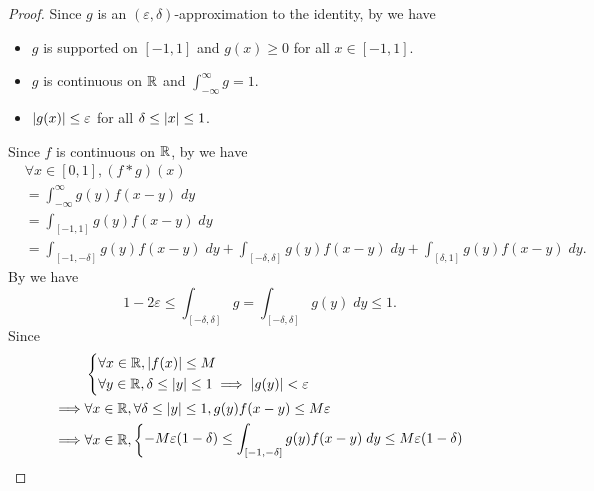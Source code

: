 \begin{proof}
  Since \(g\) is an \((\varepsilon, \delta)\)-approximation to the identity, by  we have
  \begin{itemize}
    \item \(g\) is supported on \([-1, 1]\) and \(g(x) \geq 0\) for all \(x \in [-1, 1]\).
    \item \(g\) is continuous on \(\mathbb{R}\) and \(\int_{-\infty}^\infty g = 1\).
    \item \(\left\lvert g(x)\right\rvert \leq \varepsilon\) for all \(\delta \leq \left\lvert x\right\rvert \leq 1\).
  \end{itemize}
  Since \(f\) is continuous on \(\mathbb{R}\), by  we have
  \begin{align*}
     & \forall x \in [0, 1], (f * g)(x)                                                                                                    \\
     & = \int_{-\infty}^\infty g(y) f(x - y) \; dy                                                                                         \\
     & = \int_{[-1, 1]} g(y) f(x - y) \; dy                                                                                                \\
     & = \int_{[-1, -\delta]} g(y) f(x - y) \; dy + \int_{[-\delta, \delta]} g(y) f(x - y) \; dy + \int_{[\delta, 1]} g(y) f(x - y) \; dy.
  \end{align*}
  By  we have
  \[
    1 - 2 \varepsilon \leq \int_{[-\delta, \delta]} g = \int_{[-\delta, \delta]} g(y) \; dy \leq 1.
  \]
  Since
  \begin{align*}
             & \begin{dcases}
                 \forall x \in \R, \abs{f(x)} \leq M \\
                 \forall y \in \R, \delta \leq \abs{y} \leq 1 \implies \abs{g(y)} < \varepsilon
               \end{dcases}                                                                           \\
    \implies & \forall x \in \R, \forall \delta \leq \abs{y} \leq 1, g(y) f(x - y) \leq M \varepsilon                                                                  \\
    \implies & \forall x \in \R, \begin{dcases}
                                   -M \varepsilon (1 - \delta) \leq \int_{[-1, -\delta]} g(y) f(x - y) \; dy \leq M \varepsilon (1 - \delta) \\

\end{dcases}
\end{align*}
\end{proof}
